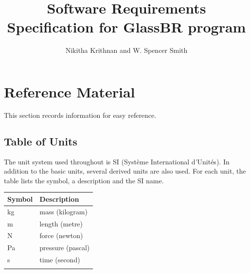 \documentclass[12pt]{article}
\title{Software Requirements Specification for GlassBR program}
\author{Nikitha Krithnan and W. Spencer Smith}
\begin{document}
\maketitle
\tableofcontents
\newpage
\section{Reference Material}
\label{Sec:RefeMate}
This section records information for easy reference.
\subsection{Table of Units}
\label{Sec:TablofUnit}
The unit system used throughout is SI (Syst\`{e}me International d'Unit\'{e}s). In addition to the basic units, several derived units are also used. For each unit, the table lists the symbol, a description and the SI name.
\begin{longtable*}{l l}
\toprule
Symbol & Description
\\
\midrule
kg & mass (kilogram)
\\
m & length (metre)
\\
N & force (newton)
\\
Pa & pressure (pascal)
\\
s & time (second)
\\
\bottomrule
\label{Table:TablofUnit}
\end{longtable*}
\end{document}
